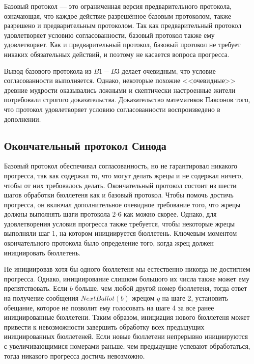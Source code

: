 \documentclass[12pt, a4paper]{article} %
\begin{document}
Базовый протокол --- это ограниченная версия предварительного протокола, означающая, что каждое действие разрешённое базовым протоколом, также разрешено и предварительным протоколом. Так как предварительный протокол удовлетворяет условию согласованности, базовый протокол также ему удовлетворяет. Как и предварительный протокол, базовый протокол не требует никаких обязательных действий, и поэтому не касается вопроса прогресса.

Вывод базового протокола из $B1 - B3$ делает очевидным, что условие согласованности выполняется. Однако, некоторые похожие <<очевидные>> древние мудрости оказывались ложными и скептически настроенные жители потребовали строгого доказательства. Доказательство математиков Паксонов того, что протокол удовлетворяет условию согласованности воспроизведено в дополнении.

\subsection{Окончательный протокол Синода}

Базовый протокол обеспечивал согласованность, но не гарантировал никакого прогресса, так как содержал то, что могут делать жрецы и не содержал ничего, чтобы от них требовалось делать. Окончательный протокол состоит из шести шагов обработки бюллетеня как и базовый протокол. Чтобы помочь достичь прогресса, он включал дополнительное очевидное требование того, что жрецы должны выполнять шаги протокола 2-6 как можно скорее. Однако, для удовлетворения условия прогресса также требуется, чтобы некоторые жрецы выполняли шаг 1, на котором инициируется бюллетень. Ключевым  моментом окончательного протокола было определение того, когда жрец должен инициировать бюллетень.

Не инициировав хотя бы одного бюллетеня мы естественно никогда не достигнем прогресса. Однако, инициирование слишком большого их числа также может ему препятствовать. Если $b$ больше, чем любой другой номер бюллетеня, тогда ответ на получение сообщения $NextBallot(b)$  жрецом $q$ на шаге 2, установить обещание, которое не позволит ему голосовать на шаге 4 за все ранее инициированные бюллетени. Таким образом, инициация нового бюллетеня может привести к невозможности завершить обработку всех предыдущих инициированных бюллетеней. Если новые бюллетени непрерывно инициируются с увеличивающимися номерами раньше, чем предыдущие успевают обработаться, тогда никакого прогресса достичь невозможно.
\end{document}
